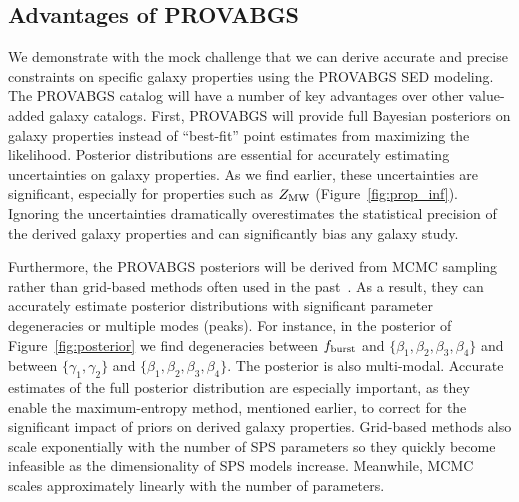 \subsection{Advantages of PROVABGS}
We demonstrate with the mock challenge that we can derive accurate and precise
constraints on specific galaxy properties using the {\sc PROVABGS} SED modeling.
The {\sc PROVABGS} catalog will have a number of key advantages over other
value-added galaxy catalogs. 
First, {\sc PROVABGS} will provide full Bayesian posteriors on galaxy
properties instead of ``best-fit'' point estimates from maximizing the
likelihood. 
Posterior distributions are essential for accurately estimating uncertainties
on galaxy properties.  
As we find earlier, these uncertainties are significant, especially for
properties such as $Z_{\rm MW}$ (Figure~\ref{fig:prop_inf}). 
Ignoring the uncertainties dramatically overestimates the statistical precision
of the derived galaxy properties and can significantly bias any galaxy study.

Furthermore, the {\sc PROVABGS} posteriors will be derived from MCMC sampling
rather than grid-based methods often used in the
past~\citep[\emph{e.g.}][]{dacunha2008, moustakas2013, boquien2019}.
As a result, they can accurately estimate posterior distributions with
significant parameter degeneracies or multiple modes (peaks). 
For instance, in the posterior of Figure~\ref{fig:posterior} we find
degeneracies between $f_{\rm burst}$ and $\{\beta_1, \beta_2, \beta_3,
\beta_4\}$ and between $\{\gamma_1, \gamma_2\}$ and $\{\beta_1, \beta_2,
\beta_3, \beta_4\}$. 
The posterior is also multi-modal. 
Accurate estimates of the full posterior distribution are especially important,
as they enable the maximum-entropy method, mentioned earlier, 
to correct for the significant impact of priors on derived galaxy properties.
Grid-based methods also scale exponentially with the number of SPS parameters
so they quickly become infeasible as the dimensionality of SPS models increase. 
Meanwhile, MCMC scales approximately linearly with the number of parameters. 

